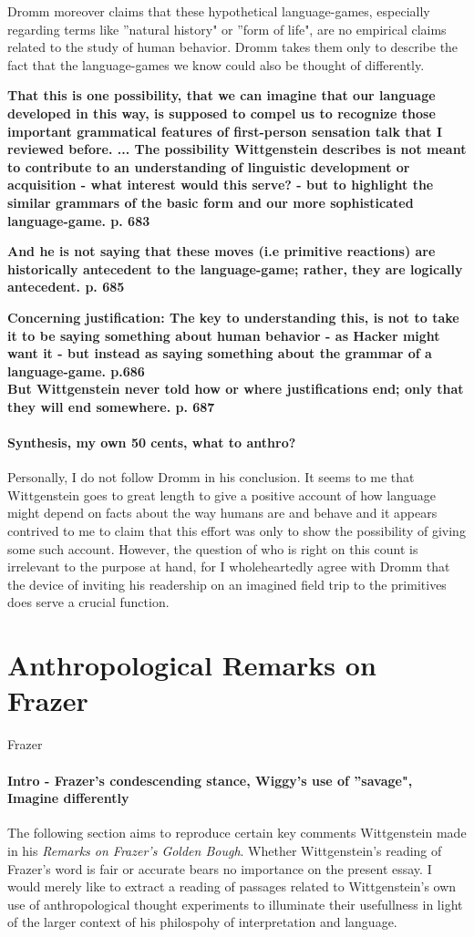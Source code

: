 \documentclass{article}
\begin{document}
Dromm moreover claims that these hypothetical language-games, especially regarding terms like ''natural history" or ''form of life", are no empirical claims related to the study of human behavior. Dromm takes them only to describe the fact that the language-games we know could also be thought of differently.

\textbf{That this is one possibility, that we can imagine that our language developed in this way, is supposed to compel us to recognize those important grammatical features of first-person sensation talk that I reviewed before. ... The possibility Wittgenstein describes is not meant to contribute to an understanding of linguistic development or acquisition - what interest would this serve? - but to highlight the similar grammars of the basic form and our more sophisticated language-game. p. 683}

\textbf{And he is not saying that these moves (i.e primitive reactions) are historically antecedent to the language-game; rather, they are logically antecedent. p. 685}

\textbf{Concerning justification: The key to understanding this, is not to take it to be saying something about human behavior - as Hacker might want it - but instead as saying something about the grammar of a language-game. p.686\\
But Wittgenstein never told how or where justifications end; only that they will end somewhere. p. 687}
\paragraph{Synthesis, my own 50 cents, what to anthro?}
Personally, I do not follow Dromm in his conclusion. It seems to me that Wittgenstein goes to great length to give a positive account of how language might depend on facts about the way humans are and behave and it appears contrived to me to claim that this effort was only to show the possibility of giving some such account. However, the question of who is right on this count is irrelevant to the purpose at hand, for I wholeheartedly agree with Dromm that the device of inviting his readership on an imagined field trip to the primitives does serve a crucial function. 

\section{Anthropological Remarks on Frazer}
\hypertarget{sec3}{Frazer}
\paragraph{Intro - Frazer's condescending stance, Wiggy's use of ''savage", Imagine differently}
The following section aims to reproduce certain key comments Wittgenstein made in his \textit{Remarks on Frazer's Golden Bough}. Whether Wittgenstein's reading of Frazer's word is fair or accurate bears no importance on the present essay. I would merely like to extract a reading of passages related to Wittgenstein's own use of anthropological thought experiments to illuminate their usefullness in light of the larger context of his philospohy of interpretation and language. 
\end{document}
